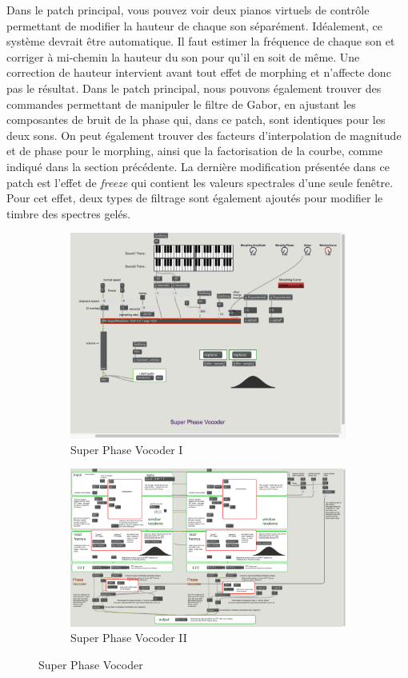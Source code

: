 Dans le patch principal, vous pouvez voir deux pianos virtuels de contrôle permettant de modifier la hauteur de chaque son séparément. Idéalement, ce système devrait être automatique. Il faut estimer la fréquence de chaque son et corriger à mi-chemin la hauteur du son pour qu'il en soit de même. Une correction de hauteur intervient avant tout effet de morphing et n'affecte donc pas le résultat. Dans le patch principal, nous pouvons également trouver des commandes permettant de manipuler le filtre de Gabor, en ajustant les composantes de bruit de la phase qui, dans ce patch, sont identiques pour les deux sons. On peut également trouver des facteurs d’interpolation de magnitude et de phase pour le morphing, ainsi que la factorisation de la courbe, comme indiqué dans la section précédente. La dernière modification présentée dans ce patch est l'effet de \textit{freeze} qui contient les valeurs spectrales d'une seule fenêtre. Pour cet effet, deux types de filtrage sont également ajoutés pour modifier le timbre des spectres gelés.


\begin{figure}
\centering
\begin{subfigure}{\textwidth}
  \centering
  \includegraphics[width=.8\linewidth]{Graphs/FirstMorphingTry.png}
  \caption{Super Phase Vocoder I}
  \label{FirstMorphingTry}
\end{subfigure}

\begin{subfigure}{\textwidth}
  \centering
  \includegraphics[width=.8\linewidth]{Graphs/SuperPhaseVoc.png}
  \caption{Super Phase Vocoder II}
  \label{SuperPhaseVoc}
\end{subfigure}
\caption{Super Phase Vocoder}
\label{PhaseVocoder}
\end{figure}

